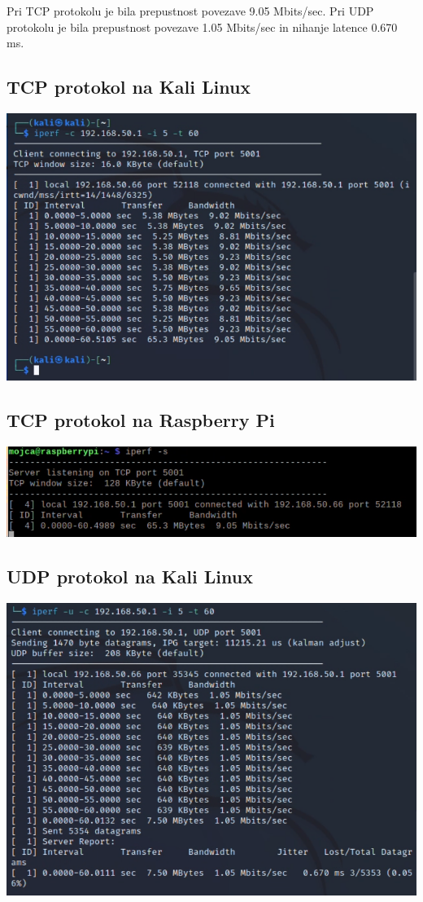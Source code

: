 \documentclass[11pt,a4paper,slovene]{article}
\begin{document}
Pri TCP protokolu je bila prepustnost povezave 9.05 Mbits/sec.
Pri UDP protokolu je bila prepustnost povezave 1.05 Mbits/sec in nihanje latence 0.670 ms.

\subsection{TCP protokol na Kali Linux}
\includegraphics[width=\textwidth]{2_dn_tcp_g_kali}

\subsection{TCP protokol na Raspberry Pi}
\includegraphics[width=\textwidth]{2_dn_tcp_g_rpi}

\subsection{UDP protokol na Kali Linux}
\includegraphics[width=\textwidth]{2_dn_udp_g_kali}
\end{document}
